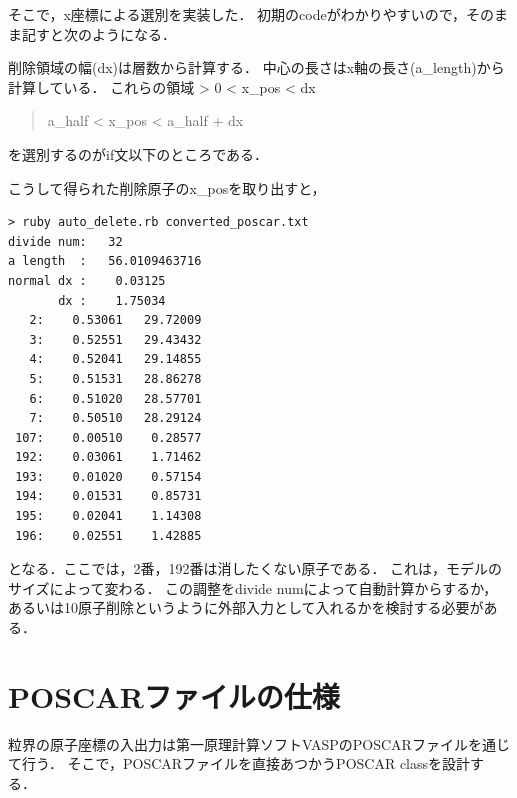 そこで，x座標による選別を実装した．
初期のcodeがわかりやすいので，そのまま記すと次のようになる．

\begin{Shaded}
\end{Shaded}

削除領域の幅(dx)は層数から計算する．
中心の長さはx軸の長さ(a\_length)から計算している． これらの領域
\textgreater{} 0 \textless{} x\_pos \textless{} dx

\begin{quote}
a\_half \textless{} x\_pos \textless{} a\_half + dx
\end{quote}
を選別するのがif文以下のところである．

こうして得られた削除原子のx\_posを取り出すと，

\begin{verbatim}
> ruby auto_delete.rb converted_poscar.txt 
divide num:   32
a length  :   56.0109463716
normal dx :    0.03125
       dx :    1.75034
   2:    0.53061   29.72009
   3:    0.52551   29.43432
   4:    0.52041   29.14855
   5:    0.51531   28.86278
   6:    0.51020   28.57701
   7:    0.50510   28.29124
 107:    0.00510    0.28577
 192:    0.03061    1.71462
 193:    0.01020    0.57154
 194:    0.01531    0.85731
 195:    0.02041    1.14308
 196:    0.02551    1.42885
\end{verbatim}

となる．ここでは，2番，192番は消したくない原子である．
これは，モデルのサイズによって変わる． この調整をdivide
numによって自動計算からするか，
あるいは10原子削除というように外部入力として入れるかを検討する必要がある．

    \section{POSCARファイルの仕様}\label{poscarux30d5ux30a1ux30a4ux30ebux306eux4ed5ux69d8}

粒界の原子座標の入出力は第一原理計算ソフトVASPのPOSCARファイルを通じて行う．
そこで，POSCARファイルを直接あつかうPOSCAR classを設計する．

